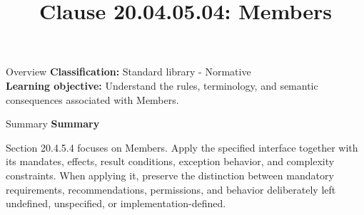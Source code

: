 \documentclass[10pt,letterpaper]{article}
\title{Clause 20.04.05.04: Members}
\author{}
\date{}
\begin{document}
\maketitle
\begin{CornellOverviewBox}{Overview}
\textbf{Classification:} Standard library - Normative\\[2pt]
\textbf{Learning objective:} Understand the rules, terminology, and semantic consequences associated with Members.
\end{CornellOverviewBox}\begin{CornellSummaryBox}{Summary}
{\sffamily\bfseries\color{Accent} Summary}\par\vspace{3pt}Section 20.4.5.4 focuses on Members. Apply the specified interface together with its mandates, effects, result conditions, exception behavior, and complexity constraints. When applying it, preserve the distinction between mandatory requirements, recommendations, permissions, and behavior deliberately left undefined, unspecified, or implementation-defined.
\end{CornellSummaryBox}
\end{document}
